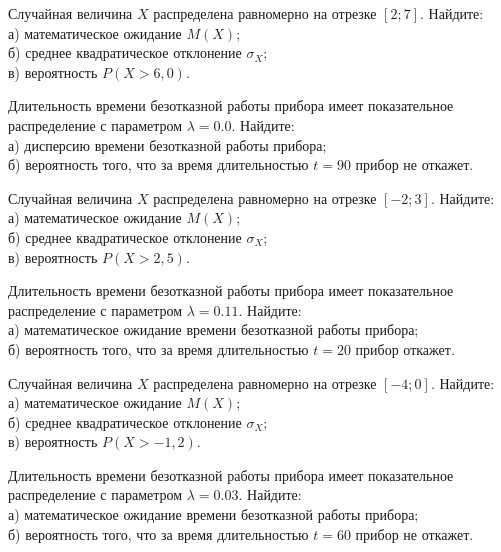 \vfill

\newpage\setcounter{zad}{0}

\z Случайная величина $X$ распределена равномерно на отрезке $[2; 7]$. Найдите: \\ \quad а) математическое ожидание $M(X)$; \\ \quad б) среднее квадратическое отклонение $\sigma_X$; \\ \quad в) вероятность $P(X>6{,}0)$.


\vfill

\z Длительность времени безотказной работы прибора имеет показательное распределение с параметром $\lambda = 0.0$. Найдите: \\ \quad а) дисперсию времени безотказной работы прибора; \\ \quad б) вероятность того, что за время длительностью $t = 90$ прибор не откажет.
 

\vfill

\newpage\setcounter{zad}{0}

\z Случайная величина $X$ распределена равномерно на отрезке $[-2; 3]$. Найдите: \\ \quad а) математическое ожидание $M(X)$; \\ \quad б) среднее квадратическое отклонение $\sigma_X$; \\ \quad в) вероятность $P(X>2{,}5)$.


\vfill

\z Длительность времени безотказной работы прибора имеет показательное распределение с параметром $\lambda = 0.11$. Найдите: \\ \quad а) математическое ожидание времени безотказной работы прибора; \\ \quad б) вероятность того, что за время длительностью $t = 20$ прибор откажет.
 

\vfill

\newpage\setcounter{zad}{0}

\z Случайная величина $X$ распределена равномерно на отрезке $[-4; 0]$. Найдите: \\ \quad а) математическое ожидание $M(X)$; \\ \quad б) среднее квадратическое отклонение $\sigma_X$; \\ \quad в) вероятность $P(X>-1{,}2)$.


\vfill

\z Длительность времени безотказной работы прибора имеет показательное распределение с параметром $\lambda = 0.03$. Найдите: \\ \quad а) математическое ожидание времени безотказной работы прибора; \\ \quad б) вероятность того, что за время длительностью $t = 60$ прибор не откажет.
 

